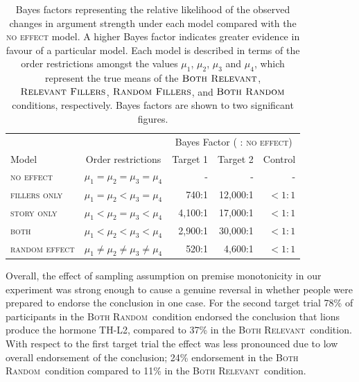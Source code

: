 \documentclass[doc,12pt]{apa}
\newcommand{\relevant}{\textsc{Both Relevant}}
\newcommand{\relevantdata}{\textsc{Relevant Fillers}}
\newcommand{\randomdata}{\textsc{Random Fillers}}
\newcommand{\random}{\textsc{Both Random}}
\begin{document}
\begin{table}[t]
\hspace{-5mm}
\begin{tabular}{lcrrr}
\toprule
 & & \multicolumn{3}{c}{Bayes Factor ( : {\textsc{no effect}})} \\
\cmidrule{3-5}
Model & Order restrictions & Target 1 & Target 2 & Control \\
\midrule
\textsc{no effect} & $ \mu_1 = \mu_2 = \mu_3 = \mu_4$ & - & - & - \\
\textsc{fillers only} & $ \mu_1 = \mu_2 < \mu_3 = \mu_4$ & 740:1 & 12,000:1 & $< 1:1$ \\
\textsc{story only} & $ \mu_1 < \mu_2 = \mu_3 < \mu_4$ & 4,100:1 & 17,000:1 & $< 1:1$ \\
\textsc{both} & $ \mu_1 < \mu_2 < \mu_3 < \mu_4$ & 2,900:1 & 30,000:1 & $< 1:1$ \\
\textsc{random effect} & $ \mu_1 \neq \mu_2 \neq \mu_3 \neq \mu_4$ & 520:1 & 4,600:1 & $< 1:1$ \\
\bottomrule
\end{tabular}
\caption{%
Bayes factors representing the relative likelihood of the observed changes in argument strength under each model compared with the \textsc{no effect} model. A higher Bayes factor indicates greater evidence in favour of a particular model. Each model is described in terms of the order restrictions amongst the values $\mu_1$, $\mu_2$, $\mu_3$ and $\mu_4$, which represent the true means of the $\relevant$, $\relevantdata$, $\randomdata$, and $\random$ conditions, respectively. Bayes factors are shown to two significant figures.
}
\label{tbl:modelbayesfactors}
\end{table}


Overall, the effect of sampling assumption on premise monotonicity in our experiment was strong enough to cause a genuine reversal in whether people were prepared to endorse the conclusion in one case. For the second target trial 78\% of participants in the \random\ condition endorsed the conclusion that lions produce the hormone TH-L2, compared to 37\% in the \relevant\ condition. With respect to the first target trial the effect was less pronounced due to low overall endorsement of the conclusion; 24\% endorsement in the \random\ condition compared to 11\% in the \relevant\ condition.
\end{document}
